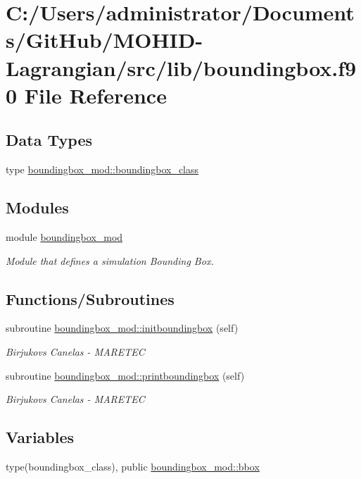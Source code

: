 \hypertarget{boundingbox_8f90}{}\section{C\+:/\+Users/administrator/\+Documents/\+Git\+Hub/\+M\+O\+H\+I\+D-\/\+Lagrangian/src/lib/boundingbox.f90 File Reference}
\label{boundingbox_8f90}
\subsection*{Data Types}
\begin{DoxyCompactItemize}
\item 
type \hyperlink{structboundingbox__mod_1_1boundingbox__class}{boundingbox\+\_\+mod\+::boundingbox\+\_\+class}
\end{DoxyCompactItemize}
\subsection*{Modules}
\begin{DoxyCompactItemize}
\item 
module \hyperlink{namespaceboundingbox__mod}{boundingbox\+\_\+mod}
\begin{DoxyCompactList}\small\item\em Module that defines a simulation Bounding Box. \end{DoxyCompactList}\end{DoxyCompactItemize}
\subsection*{Functions/\+Subroutines}
\begin{DoxyCompactItemize}
\item 
subroutine \hyperlink{namespaceboundingbox__mod_a35e41bb92c19802441dd8d748c3acfb4}{boundingbox\+\_\+mod\+::initboundingbox} (self)
\begin{DoxyCompactList}\small\item\em Birjukovs Canelas -\/ M\+A\+R\+E\+T\+EC \end{DoxyCompactList}\item 
subroutine \hyperlink{namespaceboundingbox__mod_a6ec461b758bc180dc72b5fb23169feca}{boundingbox\+\_\+mod\+::printboundingbox} (self)
\begin{DoxyCompactList}\small\item\em Birjukovs Canelas -\/ M\+A\+R\+E\+T\+EC \end{DoxyCompactList}\end{DoxyCompactItemize}
\subsection*{Variables}
\begin{DoxyCompactItemize}
\item 
type(boundingbox\+\_\+class), public \hyperlink{namespaceboundingbox__mod_a45e98e492bb546328c98f618a74622ec}{boundingbox\+\_\+mod\+::bbox}
\end{DoxyCompactItemize}
